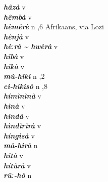 \begin{multicols}{2}
{{\bfseries\itshape hâzà}} \relax  v  \relax   \relax  {} \relax   \relax  \\
{{\bfseries\itshape hêmbà}} \relax  v  \relax   \relax  {} \relax   \relax  \\
{{\bfseries\itshape hèmêrè}} \relax  n  ,6  \relax  Afrikaans, via Lozi \relax  \\
{{\bfseries\itshape hênjà}} \relax  v  \relax   \relax  {} \relax   \relax  \\
{{\bfseries\itshape hèːrà {\textasciitilde} hwèrà}} \relax  v  \relax   \relax  {} \relax   \relax  \\
{{\bfseries\itshape hîbà}} \relax  v  \relax   \relax  {} \relax   \relax  \\
{{\bfseries\itshape hîkà}} \relax  v  \relax   \relax  {} \relax   \relax  \\
{{\bfseries\itshape mù-hîkì}} \relax  n  ,2  \relax   \relax  \\
{{\bfseries\itshape cì-híkìsò}} \relax  n  ,8  \relax   \relax  \\
{{\bfseries\itshape hímìnìnà}} \relax  v  \relax   \relax  {} \relax   \relax  \\
{{\bfseries\itshape hìnà}} \relax  v  \relax   \relax  {} \relax   \relax  \\
{{\bfseries\itshape hìndà}} \relax  v  \relax   \relax  {} \relax   \relax  \\
{{\bfseries\itshape hìndìrìrà}} \relax  v  \relax  {} \relax   \relax  \\
{{\bfseries\itshape híngìsà}} \relax  v  \relax   \relax  {} \relax   \relax  \\
{{\bfseries\itshape mà-hìrà}} \relax  n   \relax   \relax  \\
{{\bfseries\itshape hîtà}} \relax  v  \relax   \relax  {} \relax   \relax  \\
{{\bfseries\itshape hítùrà}} \relax  v  \relax   \relax  {} \relax   \relax  \\
{{\bfseries\itshape rûː-hò}} \relax  n   \relax  {} \relax   \relax  \\

\end{multicols}
